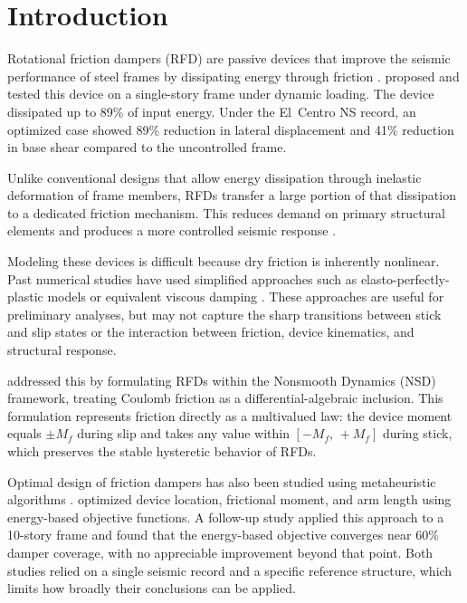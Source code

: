 \documentclass[preprint,12pt,authoryear]{elsarticle}
\newcommand{\Mf}{M_{\!f}}
\begin{document}
\section{Introduction}
\label{sec:intro}

Rotational friction dampers (RFD) are passive devices that improve the seismic
performance of steel frames by dissipating energy through friction
\citep{pall_friction_1980, pall_response_1982, jaisee_state---art_2021}.
\citet{Mualla2002} proposed and tested this device on a single-story frame under
dynamic loading. The device dissipated up to 89\% of input energy. Under the
El~Centro NS record, an optimized case showed 89\% reduction in lateral
displacement and 41\% reduction in base shear compared to the uncontrolled frame.

Unlike conventional designs that allow energy dissipation through inelastic
deformation of frame members, RFDs transfer a large portion of that dissipation to
a dedicated friction mechanism. This reduces demand on primary structural elements
and produces a more controlled seismic response \citep{de_domenico_editorial_2020}.

Modeling these devices is difficult because dry friction is inherently nonlinear.
Past numerical studies have used simplified approaches such as elasto-perfectly-plastic
models or equivalent viscous damping \citep{lee_seismic_2025, Jarrahi2020jbe}. These
approaches are useful for preliminary analyses, but may not capture the sharp
transitions between stick and slip states or the interaction between friction, device
kinematics, and structural response.

\citet{Namorado2024} addressed this by formulating RFDs within the Nonsmooth Dynamics
(NSD) framework, treating Coulomb friction as a differential-algebraic inclusion. This
formulation represents friction directly as a multivalued law: the device moment equals
$\pm\Mf$ during slip and takes any value within $[-\Mf,\,+\Mf]$ during stick, which
preserves the stable hysteretic behavior of RFDs.

Optimal design of friction dampers has also been studied using metaheuristic algorithms
\citep{moreschi_design_2003, moghaddam_optimal_2022, miguel_simultaneous_2016,
ontiveros-perez_reliability-based_2019}. \citet{Jarrahi2020jbe} optimized device
location, frictional moment, and arm length using energy-based objective functions.
A follow-up study \citep{Jarrahi2020sdee} applied this approach to a 10-story frame
and found that the energy-based objective converges near 60\% damper coverage, with
no appreciable improvement beyond that point. Both studies relied on a single seismic
record and a specific reference structure, which limits how broadly their conclusions
can be applied.
\end{document}
